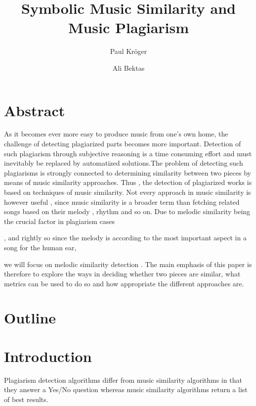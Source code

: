 \documentclass{article}
\author{Paul Kröger \and Ali Bektas}
\title{Symbolic Music Similarity and Music Plagiarism}
\begin{document}
	\maketitle

	\section*{Abstract} 

	As it becomes ever more easy to produce music from one's own home, the challenge of detecting plagiarized 
	parts becomes more important. Detection of such plagiarism through subjective reasoning is a time consuming 
	effort and must inevitably be replaced by automatized solutions.The problem of detecting such plagiarisms 
	is strongly connected to determining similarity between two pieces by means of music similarity approaches. 
	Thus , the detection of plagiarized works is based on techniques of music similarity. Not every 
	approach in music similarity is however useful , since music similarity is a broader term than fetching 
	related songs based on their melody , rhythm and so on. 
	Due to melodic similarity being the crucial factor in plagiarism cases \cite{one_point_one}

	, and rightly so since the 
	melody is according to \cite{lost} the most important aspect in a song for the human ear,

	we will focus on melodic similarity detection . The main emphasis of this paper is therefore to 
	explore the ways in deciding whether two pieces are similar, what metrics can be used to do so and how 
	appropriate the different approaches are.  
	
	\section*{Outline}


	\section*{Introduction}
		Plagiarism detection algorithms differ from music similarity algorithms in that they answer a Yes/No question whereas music similarity algorithms return a list of best results.
\end{document}
